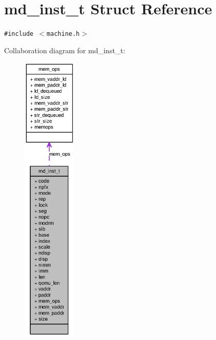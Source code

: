 \section{md\_\-inst\_\-t Struct Reference}
\label{structmd__inst__t}
{\tt \#include $<$machine.h$>$}

Collaboration diagram for md\_\-inst\_\-t:\nopagebreak
\begin{figure}[H]
\begin{center}
\leavevmode
\includegraphics[height=400pt]{structmd__inst__t__coll__graph}
\end{center}
\end{figure}
